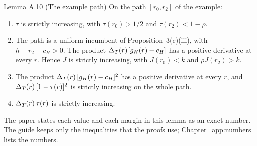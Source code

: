 \begin{paperresult}{Lemma A.10 (The example path)}
On the path \([r_0,r_2]\) of the example:
\begin{enumerate}[label=(\alph*),leftmargin=2em]
\item \(\tau\) is strictly increasing, with \(\tau(r_0)>1/2\) and \(\tau(r_2)<1-\rho\).
\item The path is a uniform incumbent of Proposition~3(c)(iii), with \(h-r_2-c_H>0\). The product
\(\Delta_T(r)\,[g_H(r)-c_H]\) has a positive derivative at every \(r\). Hence \(J\) is strictly increasing, with
\(J(r_0)<k\) and \(\rho J(r_2)>k\).
\item The product \(\Delta_T(r)\,[g_H(r)-c_H]^2\) has a positive derivative at every \(r\), and \(\Delta_T(r)\,[1-\tau(r)]^2\) is
strictly increasing on the whole path.
\item \(\Delta_T(r)\,\tau(r)\) is strictly increasing.
\end{enumerate}
\end{paperresult}

The paper states each value and each margin in this lemma as an exact number. The guide keeps only the inequalities
that the proofs use; Chapter~\ref{app:numbers} lists the numbers.

